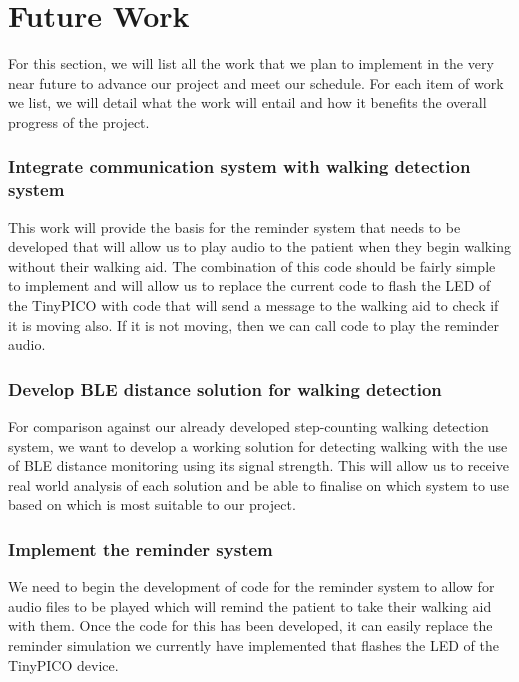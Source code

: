 {\section{Future Work}
\label{subsec:future_work}

For this section, we will list all the work that we plan to implement in the very near future to advance our project and meet our schedule. For each item of work we list, we will detail what the work will entail and how it benefits the overall progress of the project.

\subsubsection{Integrate communication system with walking detection system}

This work will provide the basis for the reminder system that needs to be developed that will allow us to play audio to the patient when they begin walking without their walking aid. The combination of this code should be fairly simple to implement and will allow us to replace the current code to flash the LED of the TinyPICO with code that will send a message to the walking aid to check if it is moving also. If it is not moving, then we can call code to play the reminder audio.

\subsubsection{Develop BLE distance solution for walking detection}

For comparison against our already developed step-counting walking detection system, we want to develop a working solution for detecting walking with the use of BLE distance monitoring using its signal strength. This will allow us to receive real world analysis of each solution and be able to finalise on which system to use based on which is most suitable to our project.

\subsubsection{Implement the reminder system}

We need to begin the development of code for the reminder system to allow for audio files to be played which will remind the patient to take their walking aid with them. Once the code for this has been developed, it can easily replace the reminder simulation we currently have implemented that flashes the LED of the TinyPICO device.

}
